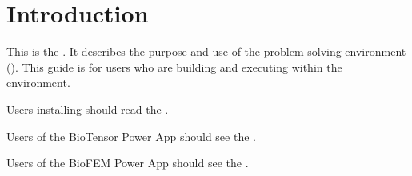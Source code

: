 %
% 
% 
% 
% 
% 
%


%

\chapter{Introduction}
\label{ch:intro}

This is the \etitle{\srug}.  It describes the purpose and use of the
\sr{} problem solving environment (\pse).  This guide is for users who
are building and executing  within the \sr{}
environment.

Users installing \sr{} should read the
.

Users of the BioTensor Power App should see the
.

Users of the BioFEM Power App should see the
.


